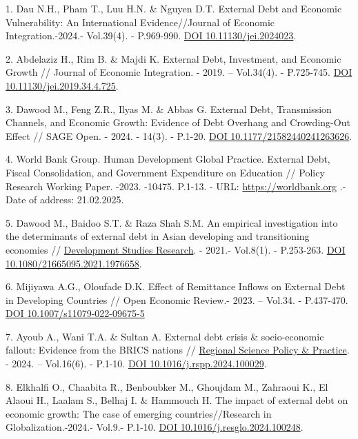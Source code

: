 \begin{references}
1. Dau N.H., Pham T., Luu H.N. \& Nguyen D.T. External Debt and Economic
Vulnerability: An International Evidence//Journal of Economic
Integration.-2024.- Vol.39(4). - P.969-990.
\href{https://doi.org/10.11130/jei.2024023}{DOI 10.11130/jei.2024023}.

2. Abdelaziz H., Rim B. \& Majdi K. External Debt, Investment, and
Economic Growth // Journal of Economic Integration. - 2019. --
Vol.34(4). - P.725-745.
\href{https://doi.org/10.11130/jei.2019.34.4.725}{DOI
10.11130/jei.2019.34.4.725}.

3. Dawood M., Feng Z.R., Ilyas M. \& Abbas G. External Debt,
Transmission Channels, and Economic Growth: Evidence of Debt Overhang
and Crowding-Out Effect // SAGE Open. - 2024. - 14(3). - P.1-20.
\href{https://doi.org/10.1177/21582440241263626}{DOI
10.1177/21582440241263626}.

4. World Bank Group. Human Development Global Practice. External Debt,
Fiscal Consolidation, and Government Expenditure on Education // Policy
Research Working Paper. -2023. -10475. P.1-13. - URL:
\href{https://documents1.https://worldbank.org/curated/en/099748506072325934/pdf/IDU09d7e7fa50fbff046e00a8a80e07ac5341e5b.pdf}{https://worldbank.org} .-
Date of address: 21.02.2025.

5. Dawood M., Baidoo S.T. \& Raza Shah S.M. An empirical investigation
into the determinants of external debt in Asian developing and
transitioning economies //
\href{https://www.tandfonline.com/journals/rdsr20}{Development Studies
Research}. - 2021.- Vol.8(1). - P.253-263.
\href{https://doi.org/10.1080/21665095.2021.1976658}{DOI
10.1080/21665095.2021.1976658}.

6. Mijiyawa A.G., Oloufade D.K. Effect of Remittance Inflows on External
Debt in Developing Countries // Open Economic Review.- 2023. -- Vol.34.
- P.437-470. \href{https://doi.org/10.1007/s11079-022-09675-5}{DOI
10.1007/s11079-022-09675-5}

7. Ayoub A., Wani T.A. \& Sultan A. External debt crisis \&
socio-economic fallout: Evidence from the BRICS nations //
\href{https://www.sciencedirect.com/journal/regional-science-policy-and-practice}{Regional
Science Policy \& Practice}. - 2024. -- Vol.16(6). - P.1-10.
\href{https://doi.org/10.1016/j.rspp.2024.100029}{DOI
10.1016/j.rspp.2024.100029}.

8. Elkhalfi O., Chaabita R., Benboubker M., Ghoujdam M., Zahraoui K., El
Alaoui H., Laalam S., Belhaj I. \& Hammouch H. The impact of external
debt on economic growth: The case of emerging countries//Research in
Globalization.-2024.- Vol.9.- P.1-10.
\href{https://doi.org/10.1016/j.resglo.2024.100248}{DOI
10.1016/j.resglo.2024.100248}.


\end{references}

